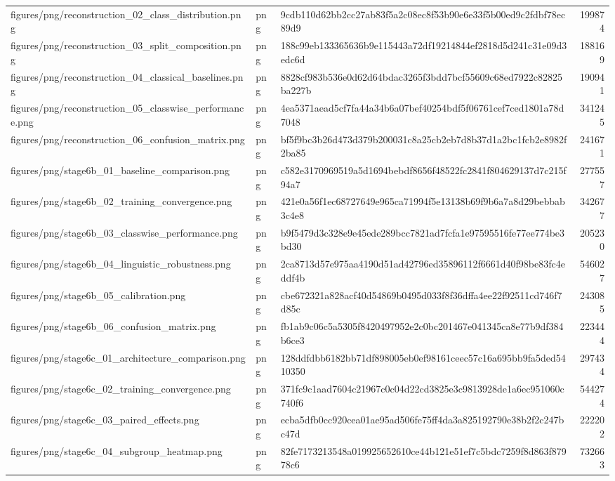 \begin{tabular}{lllr}
figures/png/reconstruction_02_class_distribution.png & png & 9cdb110d62bb2cc27ab83f5a2c08ec8f53b90e6e33f5b00ed9c2fdbf78ec89d9 & 199874 \\
figures/png/reconstruction_03_split_composition.png & png & 188c99eb133365636b9e115443a72df19214844ef2818d5d241c31e09d3edc6d & 188169 \\
figures/png/reconstruction_04_classical_baselines.png & png & 8828cf983b536e0d62d64bdac3265f3bdd7bcf55609c68ed7922c82825ba227b & 190941 \\
figures/png/reconstruction_05_classwise_performance.png & png & 4ea5371aead5cf7fa44a34b6a07bef40254bdf5f06761cef7ced1801a78d7048 & 341245 \\
figures/png/reconstruction_06_confusion_matrix.png & png & bf5f9bc3b26d473d379b200031c8a25cb2eb7d8b37d1a2bc1fcb2e8982f2ba85 & 241671 \\
figures/png/stage6b_01_baseline_comparison.png & png & c582e3170969519a5d1694bebdf8656f48522fc2841f804629137d7c215f94a7 & 277557 \\
figures/png/stage6b_02_training_convergence.png & png & 421e0a56f1ec68727649e965ca71994f5e13138b69f9b6a7a8d29bebbab3c4e8 & 342677 \\
figures/png/stage6b_03_classwise_performance.png & png & b9f5479d3c328e9e45ede289bcc7821ad7fcfa1e97595516fe77ee774be3bd30 & 205230 \\
figures/png/stage6b_04_linguistic_robustness.png & png & 2ca8713d57e975aa4190d51ad42796ed35896112f6661d40f98be83fc4eddf4b & 546027 \\
figures/png/stage6b_05_calibration.png & png & cbe672321a828acf40d54869b0495d033f8f36dffa4ee22f92511cd746f7d85c & 243085 \\
figures/png/stage6b_06_confusion_matrix.png & png & fb1ab9c06c5a5305f8420497952e2c0bc201467e041345ca8e77b9df384b6ce3 & 223444 \\
figures/png/stage6c_01_architecture_comparison.png & png & 128ddfdbb6182bb71df898005eb0ef98161ceec57c16a695bb9fa5ded5410350 & 297434 \\
figures/png/stage6c_02_training_convergence.png & png & 371fc9c1aad7604c21967c0c04d22cd3825e3c9813928de1a6ec951060c740f6 & 544274 \\
figures/png/stage6c_03_paired_effects.png & png & ecba5dfb0cc920cea01ae95ad506fe75ff4da3a825192790e38b2f2c247bc47d & 222202 \\
figures/png/stage6c_04_subgroup_heatmap.png & png & 82fe7173213548a019925652610ce44b121e51ef7c5bdc7259f8d863f87978c6 & 732663 \\

\end{tabular}
